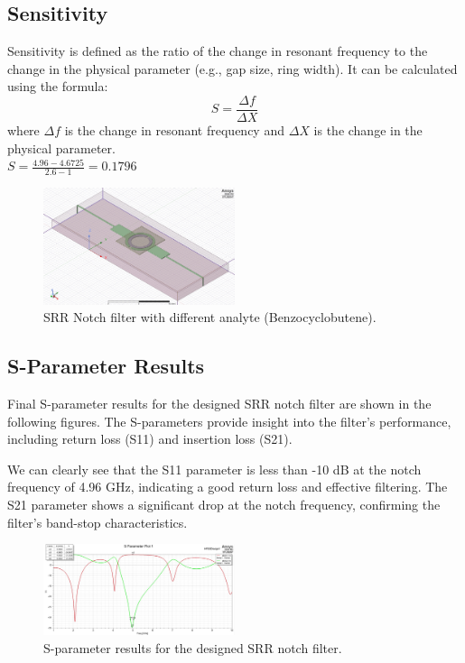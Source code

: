 \documentclass[conference]{IEEEtran}
\begin{document}
\subsection{Sensitivity}
Sensitivity is defined as the ratio of the change in resonant frequency to the change in the physical parameter (e.g., gap size, ring width). It can be calculated using the formula:
\begin{equation}        
    S = \frac{\Delta f}{\Delta X}
\end{equation}
where \( \Delta f \) is the change in resonant frequency and \( \Delta X \) is the change in the physical parameter.\\

$ S = \frac{4.96 - 4.6725}{2.6-1} = 0.1796$
\begin{figure}[h]
\centering
    \includegraphics[width=0.5\textwidth]{Images/final_dielectric_sensitivity.jpg}
    \caption{SRR Notch filter with different analyte (Benzocyclobutene).}
\end{figure}

\subsection{S-Parameter Results}
Final S-parameter results for the designed SRR notch filter are shown in the following figures. The S-parameters provide insight into the filter's performance, including return loss (S11) and insertion loss (S21).

We can clearly see that the S11 parameter is less than -10 dB at the notch frequency of 4.96 GHz, indicating a good return loss and effective filtering. The S21 parameter shows a significant drop at the notch frequency, confirming the filter's band-stop characteristics.

\begin{figure}[h]
\centering
    \includegraphics[width=0.5\textwidth]{Images/Fiinal_S_Param_Plot.jpg}
    \caption{S-parameter results for the designed SRR notch filter.}
\end{figure}
\end{document}
